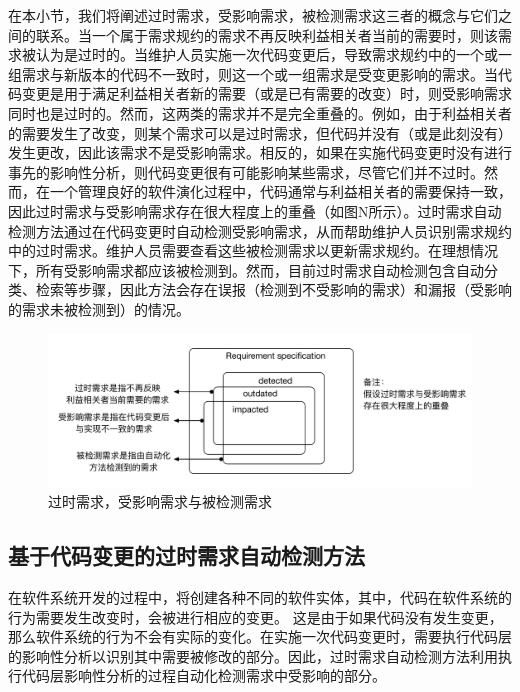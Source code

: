 在本小节，我们将阐述过时需求，受影响需求，被检测需求这三者的概念与它们之间的联系\cite{ben2015supporting}。当一个属于需求规约的需求不再反映利益相关者当前的需要时，则该需求被认为是过时的。当维护人员实施一次代码变更后，导致需求规约中的一个或一组需求与新版本的代码不一致时，则这一个或一组需求是受变更影响的需求。当代码变更是用于满足利益相关者新的需要（或是已有需要的改变）时，则受影响需求同时也是过时的。然而，这两类的需求并不是完全重叠的。例如，由于利益相关者的需要发生了改变，则某个需求可以是过时需求，但代码并没有（或是此刻没有）发生更改，因此该需求不是受影响需求。相反的，如果在实施代码变更时没有进行事先的影响性分析，则代码变更很有可能影响某些需求，尽管它们并不过时。然而，在一个管理良好的软件演化过程中，代码通常与利益相关者的需要保持一致，因此过时需求与受影响需求存在很大程度上的重叠（如图N所示）。过时需求自动检测方法通过在代码变更时自动检测受影响需求，从而帮助维护人员识别需求规约中的过时需求。维护人员需要查看这些被检测需求以更新需求规约。在理想情况下，所有受影响需求都应该被检测到。然而，目前过时需求自动检测包含自动分类、检索等步骤，因此方法会存在误报（检测到不受影响的需求）和漏报（受影响的需求未被检测到）的情况。

\begin{figure}[thb]
    \centering
    \includegraphics[width=1.0\textwidth]{./figures/related_work/outdated_requirements.pdf}
    \caption{过时需求，受影响需求与被检测需求}
    \label{F:outdated_requirements}
\end{figure}

\subsection{基于代码变更的过时需求自动检测方法}

在软件系统开发的过程中，将创建各种不同的软件实体，其中，代码在软件系统的行为需要发生改变时，会被进行相应的变更。 这是由于如果代码没有发生变更，那么软件系统的行为不会有实际的变化。在实施一次代码变更时，需要执行代码层的影响性分析以识别其中需要被修改的部分。因此，过时需求自动检测方法\cite{ben2015supporting}利用执行代码层影响性分析的过程自动化检测需求中受影响的部分。

